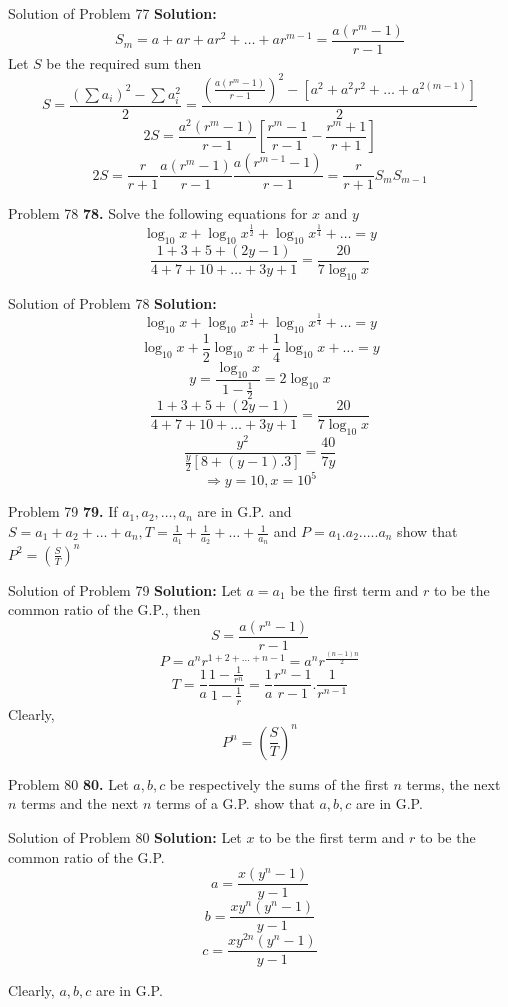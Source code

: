\documentclass[aspectratio=1610,8pt]{beamer}
\begin{document}
\begin{frame}{Solution of Problem 77}
  \textbf{Solution:} $$S_m = a + ar + ar^2 + \ldots + ar^{m - 1} = \frac{a(r^m - 1)}{r - 1}$$
  Let $S$ be the required sum then
  $$S = \frac{(\sum a_i)^2 - \sum a_i^2}{2} = \frac{\left(\frac{a(r^m - 1)}{r - 1}\right)^2 - [a^2 + a^2r^2 + \ldots + a^{2(m -
        1)}]}{2}$$
  $$2S = \frac{a^2(r^m - 1)}{r - 1}\left[\frac{r^m - 1}{r - 1} - \frac{r^m + 1}{r + 1}\right]$$
  $$2S = \frac{r}{r + 1}\frac{a(r^m - 1)}{r - 1}\frac{a(r^{m - 1} - 1)}{r - 1} = \frac{r}{r + 1}S_mS_{m - 1}$$
\end{frame}
\begin{frame}{Problem 78}
  \textbf{78.} Solve the following equations for $x$ and $y$
  $$\log_{10}x + \log_{10}x^{\frac{1}{2}} + \log_{10}x^{\frac{1}{4}} + \ldots = y$$
  $$\frac{1 + 3 + 5 + (2y - 1)}{4 + 7 + 10 + \ldots + 3y + 1} = \frac{20}{7\log_{10}x}$$
\end{frame}
\begin{frame}{Solution of Problem 78}
  \textbf{Solution:} $$\log_{10}x + \log_{10}x^{\frac{1}{2}} + \log_{10}x^{\frac{1}{4}} + \ldots = y$$
  $$\log_{10}x + \frac{1}{2}\log_{10}x + \frac{1}{4}\log_{10}x + \ldots = y$$
  $$y = \frac{\log_{10}x}{1 - \frac{1}{2}} = 2\log_{10}x$$
  $$\frac{1 + 3 + 5 + (2y - 1)}{4 + 7 + 10 + \ldots + 3y + 1} = \frac{20}{7\log_{10}x}$$
  $$\frac{y^2}{\frac{y}{2}[8 + (y - 1).3]} = \frac{40}{7y}$$
  $$\Rightarrow y = 10, x = 10^5$$
\end{frame}
\begin{frame}{Problem 79}
  \textbf{79.} If $a_1, a_2, \ldots, a_n$ are in G.P. and $S = a_1 + a_2 + \ldots + a_n, T = \frac{1}{a_1} + \frac{1}{a_2} + \ldots
  + \frac{1}{a_n}$ and $P = a_1.a_2.\ldots.a_n$ show that $P^2 = \left(\frac{S}{T}\right)^n$
\end{frame}
\begin{frame}{Solution of Problem 79}
  \textbf{Solution:} Let $a = a_1$ be the first term and $r$ to be the common ratio of the G.P., then
  $$S = \frac{a(r^n - 1)}{r - 1}$$
  $$P = a^nr^{1 + 2 + \ldots + n - 1} = a^nr^{\frac{(n - 1)n}{2}}$$
  $$T = \frac{1}{a}\frac{1 - \frac{1}{r^n}}{1 - \frac{1}{r}} = \frac{1}{a}\frac{r^n - 1}{r - 1}.\frac{1}{r^{n - 1}}$$
  Clearly, $$P^n = \left(\frac{S}{T}\right)^n$$
\end{frame}
\begin{frame}{Problem 80}
  \textbf{80.} Let $a, b, c$ be respectively the sums of the first $n$ terms, the next $n$ terms and the next $n$ terms of a
  G.P. show that $a, b, c$ are in G.P.
\end{frame}
\begin{frame}{Solution of Problem 80}
  \textbf{Solution:} Let $x$ to be the first term and $r$ to be the common ratio of the G.P.
  $$a = \frac{x(y^n - 1)}{y - 1}$$
  $$b = \frac{xy^n(y^n - 1)}{y - 1}$$
  $$c = \frac{xy^{2n}(y^n - 1)}{y - 1}$$

  Clearly, $a, b, c$ are in G.P.
\end{frame}
\end{document}
